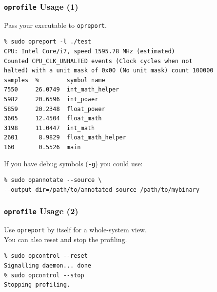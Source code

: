 \begin{frame}[fragile]
  \frametitle{{\tt oprofile} Usage (1)}
  


\begin{changemargin}{1.5cm}
  Pass your executable to {\tt opreport}.

  \begin{lstlisting}
% sudo opreport -l ./test    
CPU: Intel Core/i7, speed 1595.78 MHz (estimated)
Counted CPU_CLK_UNHALTED events (Clock cycles when not
halted) with a unit mask of 0x00 (No unit mask) count 100000
samples  %        symbol name
7550     26.0749  int_math_helper
5982     20.6596  int_power
5859     20.2348  float_power
3605     12.4504  float_math
3198     11.0447  int_math
2601      8.9829  float_math_helper
160       0.5526  main
  \end{lstlisting}
  
    If you have debug symbols ({\tt -g}) you could use:

  \begin{lstlisting}
% sudo opannotate --source \
--output-dir=/path/to/annotated-source /path/to/mybinary
  \end{lstlisting}
  \end{changemargin}
\end{frame}

\begin{frame}[fragile]
  \frametitle{{\tt oprofile} Usage (2)}
  


\begin{changemargin}{1.5cm}
    Use {\tt opreport} by itself for a whole-system view.\\
    You can also reset and stop the profiling.

  \begin{lstlisting}
% sudo opcontrol --reset 
Signalling daemon... done
% sudo opcontrol --stop
Stopping profiling.
  \end{lstlisting}
  \end{changemargin}
\end{frame}

